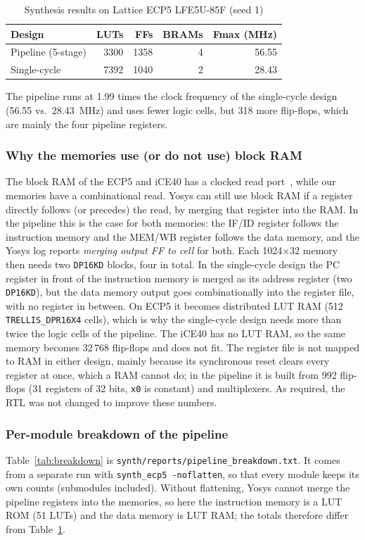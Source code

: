 \begin{table}[!t]
\centering
\caption{Synthesis results on Lattice ECP5 LFE5U-85F (seed 1)}
\label{tab:synth}
\begin{tabular}{lrrrr}
\toprule
Design & LUTs & FFs & BRAMs & Fmax (MHz) \\
\midrule
Pipeline (5-stage) & 3300 & 1358 & 4 & 56.55 \\
Single-cycle       & 7392 & 1040 & 2 & 28.43 \\
\bottomrule
\end{tabular}
\end{table}

The pipeline runs at 1.99 times the clock frequency of the single-cycle
design (56.55 vs.\ 28.43~MHz) and uses fewer logic cells, but 318 more
flip-flops, which are mainly the four pipeline registers.

\subsubsection{Why the memories use (or do not use) block RAM}
The block RAM of the ECP5 and iCE40 has a clocked read
port~\cite{yogeshECP5DS,yogeshICE40DS}, while our memories have a
combinational read. Yosys can still use block RAM if a register directly
follows (or precedes) the read, by merging that register into the RAM. In the
pipeline this is the case for both memories: the IF/ID register follows the
instruction memory and the MEM/WB register follows the data memory, and the
Yosys log reports \emph{merging output FF to cell} for both. Each 1024$\times$32
memory then needs two \texttt{DP16KD} blocks, four in total. In the
single-cycle design the PC register in front of the instruction memory is
merged as its address register (two \texttt{DP16KD}), but the data memory
output goes combinationally into the register file, with no register in
between. On ECP5 it becomes distributed LUT RAM (512 \texttt{TRELLIS\_DPR16X4}
cells), which is why the single-cycle design needs more than twice the logic
cells of the pipeline. The iCE40 has no LUT RAM, so the same memory becomes
32\,768 flip-flops and does not fit. The register file is not mapped to RAM in
either design, mainly because its synchronous reset clears every register at
once, which a RAM cannot do; in the pipeline it is built from 992 flip-flops
(31 registers of 32 bits, \texttt{x0} is constant) and multiplexers. As required, the RTL was not
changed to improve these numbers.

\subsubsection{Per-module breakdown of the pipeline}
Table~\ref{tab:breakdown} is \texttt{synth/reports/pipeline\_breakdown.txt}. It
comes from a separate run with \texttt{synth\_ecp5 -noflatten}, so that every
module keeps its own counts (submodules included). Without flattening, Yosys
cannot merge the pipeline registers into the memories, so here the instruction
memory is a LUT ROM (51 LUTs) and the data memory is LUT RAM; the totals
therefore differ from Table~\ref{tab:synth}.

